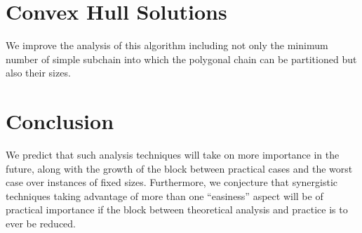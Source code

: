 
\section{Convex Hull Solutions}
\label{sec:hull}

We improve the analysis of this algorithm including not only the
minimum number of simple subchain into which the polygonal chain can
be partitioned but also their sizes.


\section{Conclusion}
\label{sec:con}

We predict that such analysis techniques will take on more importance
in the future, along with the growth of the block between practical
cases and the worst case over instances of fixed sizes. Furthermore,
we conjecture that synergistic techniques taking advantage of more
than one ``easiness'' aspect will be of practical importance if the
block between theoretical analysis and practice is to ever be reduced.

